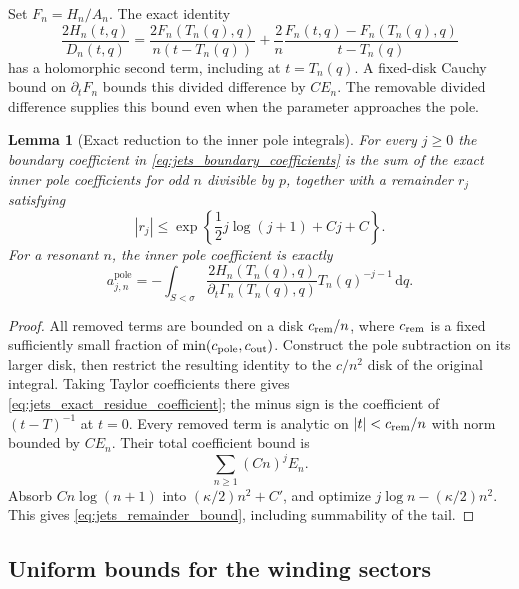 \documentclass[11pt]{article}
\numberwithin{equation}{section}
\newtheorem{lemma}[theorem]{Lemma}
\theoremstyle{definition}
\newcommand{\dd}{\,\mathrm d}
\begin{document}
Set $F_n=H_n/A_n$. The exact identity
\begin{equation}\label{eq:jets_divided_difference}
 \frac{2H_n(t,q)}{D_n(t,q)}=
 \frac{2F_n(T_n(q),q)}{n(t-T_n(q))}
 +\frac2n\frac{F_n(t,q)-F_n(T_n(q),q)}{t-T_n(q)}
\end{equation}
has a holomorphic second term, including at $t=T_n(q)$. A
fixed-disk Cauchy bound on $\partial_tF_n$ bounds this divided
difference by $CE_n$. The removable divided difference supplies this bound even when the
parameter approaches the pole.

\begin{lemma}[Exact reduction to the inner pole integrals]
\label{lem:jets_remainder}
For every $j\ge0$ the boundary coefficient in
\eqref{eq:jets_boundary_coefficients} is the sum of the exact inner
pole coefficients for odd $n$ divisible by $p$, together with a
remainder $r_j$ satisfying
\begin{equation}\label{eq:jets_remainder_bound}
 |r_j|\le \exp\left\{\frac12j\log(j+1)+Cj+C\right\}.
\end{equation}
For a resonant $n$, the inner pole coefficient is exactly
\begin{equation}\label{eq:jets_exact_residue_coefficient}
 a_{j,n}^{\mathrm{pole}}=
 -\int_{S<\sigma}
  \frac{2H_n(T_n(q),q)}{\partial_t\Gamma_n(T_n(q),q)}
  T_n(q)^{-j-1}\dd q.
\end{equation}
\end{lemma}

\begin{proof}
All removed terms are bounded on a disk $c_{\rm rem}/n$, where
$c_{\rm rem}$ is a fixed sufficiently small fraction of
$\min(c_{\rm pole},c_{\rm out})$. Construct the pole subtraction on
its larger disk, then restrict the resulting identity to the
$c/n^2$ disk of the original integral. Taking Taylor coefficients
there gives \eqref{eq:jets_exact_residue_coefficient}; the
minus sign is the coefficient of $(t-T)^{-1}$ at $t=0$. Every
removed term is analytic on $|t|<c_{\rm rem}/n$ with norm bounded by $CE_n$.
Their total coefficient bound is
\[
 \sum_{n\ge1}(Cn)^j E_n.
\]
Absorb $Cn\log(n+1)$ into $(\kappa/2)n^2+C'$, and optimize
$j\log n-(\kappa/2)n^2$. This gives
\eqref{eq:jets_remainder_bound}, including summability of the tail.
\end{proof}

\subsection{Uniform bounds for the winding sectors}
\end{document}
